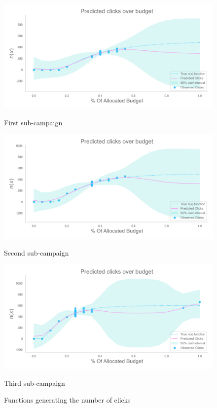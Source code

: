 \begin{figure}[!htb]
    \includegraphics[width=\linewidth]{images/part2_bidding_curve_subcamaign_0.png}
    \caption{First sub-campaign}
    \endminipage\hfill
    \includegraphics[width=\linewidth]{images/part2_bidding_curve_subcamaign_1.png}
    \caption{Second sub-campaign}
    \endminipage\hfill
    \includegraphics[width=\linewidth]{images/part2_bidding_curve_subcamaign_2.png}
    \caption{Third sub-campaign}
    \endminipage\hfill

    \caption{Functions generating the number of clicks}
    \label{curve2Fig}
\end{figure}


